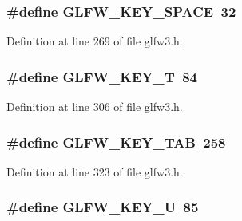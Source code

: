 \subsubsection[{G\+L\+F\+W\+\_\+\+K\+E\+Y\+\_\+\+S\+P\+A\+C\+E}]{\setlength{\rightskip}{0pt plus 5cm}\#define G\+L\+F\+W\+\_\+\+K\+E\+Y\+\_\+\+S\+P\+A\+C\+E~32}\label{group__keys_gaddb2c23772b97fd7e26e8ee66f1ad014}


Definition at line 269 of file glfw3.\+h.

\hypertarget{group__keys_ga90e0560422ec7a30e7f3f375bc9f37f9}{}
\subsubsection[{G\+L\+F\+W\+\_\+\+K\+E\+Y\+\_\+\+T}]{\setlength{\rightskip}{0pt plus 5cm}\#define G\+L\+F\+W\+\_\+\+K\+E\+Y\+\_\+\+T~84}\label{group__keys_ga90e0560422ec7a30e7f3f375bc9f37f9}


Definition at line 306 of file glfw3.\+h.

\hypertarget{group__keys_ga6908a4bda9950a3e2b73f794bbe985df}{}
\subsubsection[{G\+L\+F\+W\+\_\+\+K\+E\+Y\+\_\+\+T\+A\+B}]{\setlength{\rightskip}{0pt plus 5cm}\#define G\+L\+F\+W\+\_\+\+K\+E\+Y\+\_\+\+T\+A\+B~258}\label{group__keys_ga6908a4bda9950a3e2b73f794bbe985df}


Definition at line 323 of file glfw3.\+h.

\hypertarget{group__keys_gacad52f3bf7d378fc0ffa72a76769256d}{}
\subsubsection[{G\+L\+F\+W\+\_\+\+K\+E\+Y\+\_\+\+U}]{\setlength{\rightskip}{0pt plus 5cm}\#define G\+L\+F\+W\+\_\+\+K\+E\+Y\+\_\+\+U~85}\label{group__keys_gacad52f3bf7d378fc0ffa72a76769256d}


